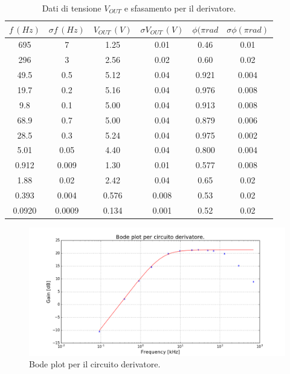 \documentclass[10pt,a4paper]{article}
\begin{document}
\begin{table}[!htb]\centering
\begin{tabular}{|c|c|c|c|c|c|}
\hline$f \, (Hz)$ & $ \sigma f \, (Hz)$ & $V_{OUT} \, (V)$ & $\sigma V_{OUT} \, (V)$ & $\phi (\pi rad$ & $\sigma \phi (\pi rad)$\\
\hline
695 & 7 & 1.25 & 0.01 & 0.46 & 0.01\\
296 & 3 & 2.56 & 0.02 & 0.60 & 0.02\\
49.5 & 0.5 & 5.12 & 0.04 & 0.921 & 0.004\\
19.7 & 0.2 & 5.16 & 0.04 & 0.976 & 0.008\\
9.8 & 0.1 & 5.00 & 0.04 & 0.913 & 0.008\\
68.9 & 0.7 & 5.00 & 0.04 & 0.879 & 0.006\\
28.5 & 0.3 & 5.24 & 0.04 & 0.975 & 0.002\\
5.01 & 0.05 & 4.40 & 0.04 & 0.800 & 0.004\\
0.912 & 0.009 & 1.30 & 0.01 & 0.577 & 0.008\\
1.88 & 0.02 & 2.42 & 0.04 & 0.65 & 0.02\\
0.393 & 0.004 & 0.576 & 0.008 & 0.53 & 0.02\\
0.0920 & 0.0009 & 0.134 & 0.001 & 0.52 & 0.02\\
\hline
\end{tabular}
\caption{Dati di tensione $V_{OUT}$ e sfasamento per il derivatore.}
\label{derivatore}
\end{table}

\begin{figure}[!htb]
\centering
  \includegraphics[scale=.5]{bodeDerivatore.png}
\caption{Bode plot per il circuito derivatore.}
\label{bodeDerivatore}
\end{figure}
\end{document}
